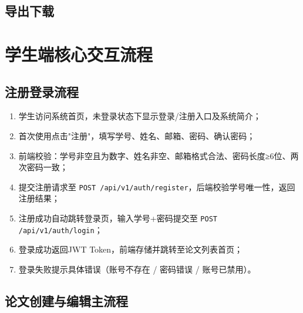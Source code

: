 \subsection{导出下载}


\section{学生端核心交互流程}

\subsection{注册登录流程}

\begin{enumerate}
    \item 学生访问系统首页，未登录状态下显示登录/注册入口及系统简介；
    \item 首次使用点击"注册"，填写学号、姓名、邮箱、密码、确认密码；
    \item 前端校验：学号非空且为数字、姓名非空、邮箱格式合法、密码长度≥6位、两次密码一致；
    \item 提交注册请求至 \texttt{POST /api/v1/auth/register}，后端校验学号唯一性，返回注册结果；
    \item 注册成功自动跳转登录页，输入学号+密码提交至 \texttt{POST /api/v1/auth/login}；
    \item 登录成功返回JWT Token，前端存储并跳转至论文列表首页；
    \item 登录失败提示具体错误（账号不存在 / 密码错误 / 账号已禁用）。
\end{enumerate}

\subsection{论文创建与编辑主流程}

